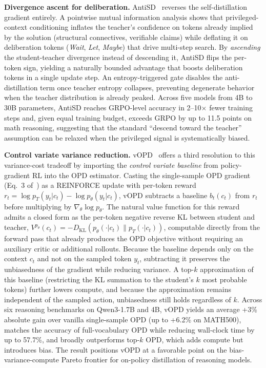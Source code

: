 \documentclass{article} %
\newcommand{\KL}{D_{\mathrm{KL}}}
\newcommand{\ptheta}{p_\theta}
\newcommand{\pteacher}{p_T}
\begin{document}
\textbf{Divergence ascent for deliberation.} AntiSD~\citep{2605.11609} reverses the self-distillation gradient entirely. A pointwise mutual information analysis shows that privileged-context conditioning inflates the teacher's confidence on tokens already implied by the solution (structural connectives, verifiable claims) while deflating it on deliberation tokens (\textit{Wait}, \textit{Let}, \textit{Maybe}) that drive multi-step search. By \emph{ascending} the student-teacher divergence instead of descending it, AntiSD flips the per-token sign, yielding a naturally bounded advantage that boosts deliberation tokens in a single update step. An entropy-triggered gate disables the anti-distillation term once teacher entropy collapses, preventing degenerate behavior when the teacher distribution is already peaked. Across five models from 4B to 30B parameters, AntiSD reaches GRPO-level accuracy in 2--10$\times$ fewer training steps and, given equal training budget, exceeds GRPO by up to 11.5 points on math reasoning, suggesting that the standard ``descend toward the teacher'' assumption can be relaxed when the privileged signal is systematically biased.

\textbf{Control variate variance reduction.} vOPD~\citep{2605.07865} offers a third resolution to this variance-cost tradeoff by importing the \emph{control variate baseline} from policy-gradient RL into the OPD estimator. Casting the single-sample OPD gradient (Eq.~3 of~\citealp{2605.07865}) as a REINFORCE update with per-token reward $r_t = \log \pteacher(y_t|c_t) - \log \ptheta(y_t|c_t)$, vOPD subtracts a baseline $b_t(c_t)$ from $r_t$ before multiplying by $\nabla_\theta \log \ptheta$. The natural value function for this reward admits a closed form as the per-token negative reverse KL between student and teacher, $V^{\ptheta}(c_t) = -\KL(\ptheta(\cdot|c_t) \parallel \pteacher(\cdot|c_t))$, computable directly from the forward pass that already produces the OPD objective without requiring an auxiliary critic or additional rollouts. Because the baseline depends only on the context $c_t$ and not on the sampled token $y_t$, subtracting it preserves the unbiasedness of the gradient while reducing variance. A top-$k$ approximation of this baseline (restricting the KL summation to the student's $k$ most probable tokens) further lowers compute, and because the approximation remains independent of the sampled action, unbiasedness still holds regardless of $k$. Across six reasoning benchmarks on Qwen3-1.7B and 4B, vOPD yields an average +3\% absolute gain over vanilla single-sample OPD (up to +6.2\% on MATH500), matches the accuracy of full-vocabulary OPD while reducing wall-clock time by up to 57.7\%, and broadly outperforms top-$k$ OPD, which adds compute but introduces bias. The result positions vOPD at a favorable point on the bias-variance-compute Pareto frontier for on-policy distillation of reasoning models.
\end{document}
